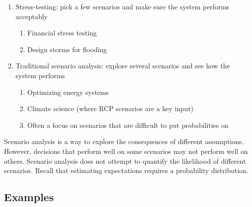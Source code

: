 \documentclass[
  letterpaper,
  DIV=11,
  numbers=noendperiod]{scrreprt}
\providecommand{\tightlist}{%
  \setlength{\itemsep}{0pt}\setlength{\parskip}{0pt}}
\begin{document}
\begin{enumerate}
\def\labelenumi{\arabic{enumi}.}
\tightlist
\item
  Stress-testing: pick a few scenarios and make sure the system performs
  acceptably

  \begin{enumerate}
  \def\labelenumii{\arabic{enumii}.}
  \tightlist
  \item
    Financial stress testing
  \item
    Design storms for flooding
  \end{enumerate}
\item
  Traditional scenario analysis: explore several scenarios and see how
  the system performs

  \begin{enumerate}
  \def\labelenumii{\arabic{enumii}.}
  \tightlist
  \item
    Optimizing energy systems
  \item
    Climate science (where RCP scenarios are a key input)
  \item
    Often a focus on scenarios that are difficult to put probabilities
    on
  \end{enumerate}
\end{enumerate}

\begin{tcolorbox}[enhanced jigsaw, arc=.35mm, breakable, title=\textcolor{quarto-callout-important-color}{\faExclamation}\hspace{0.5em}{Key point}, coltitle=black, opacityback=0, bottomtitle=1mm, colback=white, left=2mm, opacitybacktitle=0.6, toptitle=1mm, colframe=quarto-callout-important-color-frame, leftrule=.75mm, titlerule=0mm, rightrule=.15mm, bottomrule=.15mm, colbacktitle=quarto-callout-important-color!10!white, toprule=.15mm]

Scenario analysis is a way to explore the consequences of different
assumptions. However, decisions that perform well on some scenarios may
not perform well on others. Scenario analysis does not attempt to
quantify the likelihood of different scenarios. Recall that estimating
expectations requires a probability distribution.

\end{tcolorbox}

\subsection{Examples}\label{examples}
\end{document}
